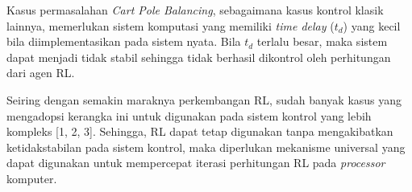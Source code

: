 Kasus permasalahan \textit{Cart Pole Balancing}, sebagaimana kasus kontrol klasik lainnya, memerlukan sistem komputasi yang memiliki \textit{time delay} (\(t_d\)) yang kecil bila diimplementasikan pada sistem nyata. Bila \(t_d\) terlalu besar, maka sistem dapat menjadi tidak stabil sehingga tidak berhasil dikontrol oleh perhitungan dari agen \ac{RL}.

Seiring dengan semakin maraknya perkembangan \ac{RL}, sudah banyak kasus yang mengadopsi kerangka ini untuk digunakan pada sistem kontrol yang lebih kompleks [1, 2, 3]. Sehingga, \ac{RL} dapat tetap digunakan tanpa mengakibatkan ketidakstabilan pada sistem kontrol, maka diperlukan mekanisme universal yang dapat digunakan untuk mempercepat iterasi perhitungan RL pada \textit{processor} komputer.
